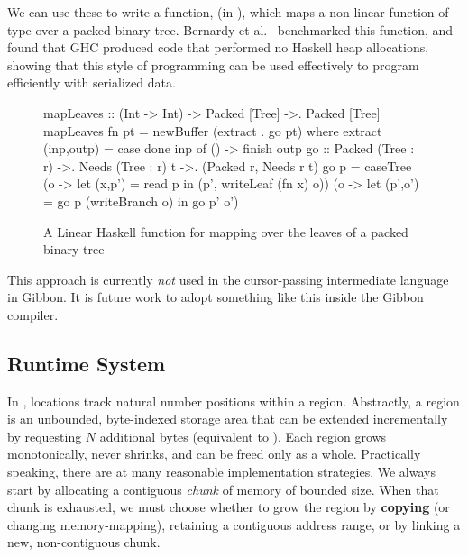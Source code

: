 We can use these to write a function,  (in ),
which maps a non-linear function of type  over a packed
binary tree. Bernardy et al.~\cite{linear-haskell} benchmarked this function,
and found that GHC produced code that performed no Haskell heap allocations,
showing that this style of programming can be used effectively to program
efficiently with serialized data.

\begin{figure}
\begin{code}
mapLeaves :: (Int -> Int) -> Packed [Tree] ->. Packed [Tree]
mapLeaves fn pt = newBuffer (extract . go pt)
  where
    extract (inp,outp) = case done inp of () -> finish outp
    go :: Packed (Tree : r) ->. Needs (Tree : r) t ->.
          (Packed r, Needs r t)
    go p = caseTree (\p o -> let (x,p') = read p
                             in (p', writeLeaf (fn x) o))
                    (\p o -> let (p',o') = go p (writeBranch o)
                             in go p' o')
\end{code}
\caption{A Linear Haskell function for mapping over the leaves of a packed
  binary tree}
\label{fig:linmapleaves}
\end{figure}

This approach is currently \emph{not} used in the cursor-passing intermediate language
in Gibbon. It is future work to adopt something like this inside the Gibbon compiler.

\subsection{Runtime System}\label{subsec:rts}

In \ourcalc, locations track natural number positions within a region.
Abstractly, a region is an unbounded, byte-indexed storage area that can be
extended incrementally by requesting $N$ additional bytes (equivalent to
).
%
Each region grows monotonically, never shrinks, and can be
freed only as a whole.
%
Practically speaking, there are at many reasonable implementation strategies.
%
We always start by allocating a contiguous {\em chunk} of memory of bounded
size.  When that chunk is exhausted, we must choose whether to grow the
region by {\bf copying} (or changing memory-mapping), retaining a contiguous
address range, or by linking a new, non-contiguous chunk.



